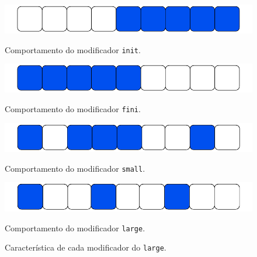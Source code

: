 \begin{figure}[htb]
    \centering

    \begin{minipage}[b]{0.80\textwidth}
        \centering
        \includegraphics[width=\textwidth]{figuras/perfo_init.pdf}
        \caption{Comportamento do modificador \texttt{init}.}
        \label{fig:perfo_init}
    \end{minipage}
    \hfill

    \begin{minipage}[b]{0.80\textwidth}
        \centering
        \includegraphics[width=\textwidth]{figuras/perfo_fini.pdf}
        \caption{Comportamento do modificador \texttt{fini}.}
        \label{fig:perfo_fini}
    \end{minipage}

    \begin{minipage}[b]{0.80\textwidth}
        \centering
        \includegraphics[width=\textwidth]{figuras/perfo_small.pdf}
        \caption{Comportamento do modificador \texttt{small}.}
        \label{fig:perfo_small}
    \end{minipage}

    \begin{minipage}[b]{0.80\textwidth}
        \centering
        \includegraphics[width=\textwidth]{figuras/perfo_large.pdf}
        \caption{Comportamento do modificador \texttt{large}.}
        \label{fig:perfo_large}
    \end{minipage}

    \caption{Característica de cada modificador do \texttt{large}.}
    \label{fig:exemploMinipage}
\end{figure}

